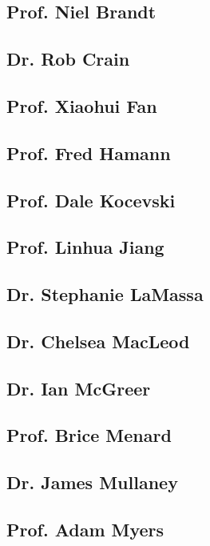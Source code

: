 \subsection{Prof. Niel Brandt}


\subsection{Dr. Rob Crain}


\subsection{Prof. Xiaohui Fan}


\subsection{Prof. Fred Hamann}


\subsection{Prof. Dale Kocevski}


\subsection{Prof. Linhua Jiang}


\subsection{Dr. Stephanie LaMassa}


\subsection{Dr. Chelsea MacLeod}


\subsection{Dr. Ian McGreer}


\subsection{Prof. Brice Menard}	


\subsection{Dr. James Mullaney}


\subsection{Prof. Adam Myers}


